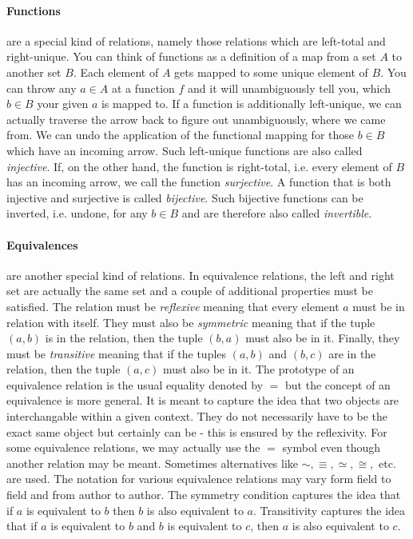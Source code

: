 



\paragraph{Functions} are a special kind of relations, namely those relations which are left-total and right-unique. You can think of functions as a definition of a map from a set $A$ to another set $B$. Each element of $A$ gets mapped to some unique element of $B$. You can throw any $a \in A$ at a function $f$ and it will unambiguously tell you, which $b \in B$ your given $a$ is mapped to. If a function is additionally left-unique, we can actually traverse the arrow back to figure out unambiguously, where we came from. We can undo the application of the functional mapping for those $b \in B$ which have an incoming arrow. Such left-unique functions are also called \emph{injective}. If, on the other hand, the function is right-total, i.e. every element of $B$ has an incoming arrow, we call the function \emph{surjective}. A function that is both injective and surjective is called \emph{bijective}. Such bijective functions can be inverted, i.e. undone, for any $b \in B$ and are therefore also called \emph{invertible}.


\paragraph{Equivalences} are another special kind of relations. In equivalence relations, the left and right set are actually the same set and a couple of additional properties must be satisfied. The relation must be \emph{reflexive} meaning that every element $a$ must be in relation with itself. They must also be \emph{symmetric} meaning that if the tuple $(a,b)$ is in the relation, then the tuple $(b,a)$ must also be in it. Finally, they must be \emph{transitive} meaning that if the tuples $(a,b)$ and $(b,c)$ are in the relation, then the tuple $(a,c)$ must also be in it. The prototype of an equivalence relation is the usual equality denoted by $=$ but the concept of an equivalence is more general. It is meant to capture the idea that two objects are interchangable within a given context. They do not necessarily have to be the exact same object but certainly can be - this is ensured by the reflexivity. For some equivalence relations, we may actually use the $=$ symbol even though another relation may be meant. Sometimes alternatives like $\sim, \equiv, \simeq, \cong,$ etc. are used. The notation for various equivalence relations may vary form field to field and from author to author. The symmetry condition captures the idea that if $a$ is equivalent to $b$ then $b$ is also equivalent to $a$. Transitivity captures the idea that if $a$ is equivalent to $b$ and $b$ is equivalent to $c$, then $a$ is also equivalent to $c$.

